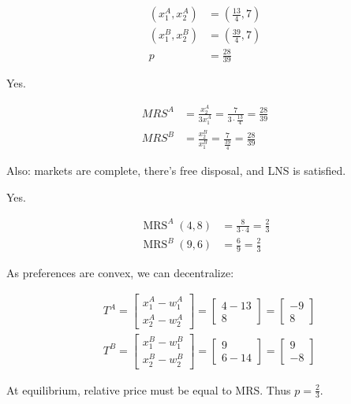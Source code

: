 {\begin{enumerate}[label=(\alph*)]
{\begin{align*}
    \left(x_1^A, x_2^A\right)&=(\frac{13}{4},7) \\
    \left(x_1^B, x_2^B\right)&=(\frac{39}{4},7) \\
    p &= \frac{28}{39}
\end{align*}
}
{\item 
Yes. 

\begin{align*}
    M R S^A &= \frac{x_2^A}{3 x_1^A}=\frac{7}{3\cdot \frac{13}{4}}=\frac{28}{39} \\
    M R S^B &= \frac{x_2^B}{x_1^B}=\frac{7}{\frac{39}{4}}=\frac{28}{39}
\end{align*}

Also: markets are complete, there's free disposal, and LNS is satisfied.
}
{\item 
Yes. 

\begin{align*}
    \operatorname{MRS}^A(4,8) &= \frac{8}{3 \cdot 4}=\frac{2}{3} \\
    \operatorname{MRS}^B(9,6) &= \frac{6}{9}=\frac{2}{3}
\end{align*}

As preferences are convex, we can decentralize:

\begin{align*}
& T^A=\left[\begin{array}{l}
x_1^A-w_1^A \\
x_2^A-w_2^A
\end{array}\right]=\left[\begin{array}{c}
4-13 \\
8
\end{array}\right]=\left[\begin{array}{c}
-9 \\
8
\end{array}\right] \\
& T^B=\left[\begin{array}{l}
x_1^B-w_1^B \\
x_2^B-w_2^B
\end{array}\right]=\left[\begin{array}{c}
9 \\
6-14
\end{array}\right]=\left[\begin{array}{c}
9 \\
-8
\end{array}\right]
\end{align*}

At equilibrium, relative price must be equal to MRS. Thus $p=\frac{2}{3}$.
}
\end{enumerate}

}
